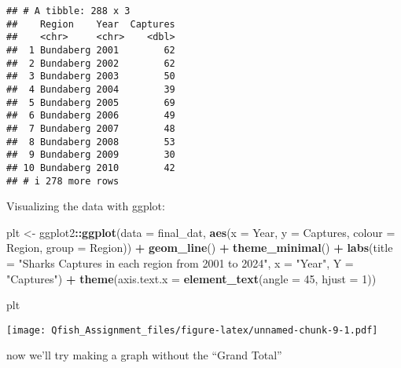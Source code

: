 \documentclass[
]{article}
\newenvironment{Shaded}{\begin{snugshade}}{\end{snugshade}}
\newcommand{\AttributeTok}[1]{\textcolor[rgb]{0.13,0.29,0.53}{#1}}
\newcommand{\DecValTok}[1]{\textcolor[rgb]{0.00,0.00,0.81}{#1}}
\newcommand{\FunctionTok}[1]{\textcolor[rgb]{0.13,0.29,0.53}{\textbf{#1}}}
\newcommand{\NormalTok}[1]{#1}
\newcommand{\OtherTok}[1]{\textcolor[rgb]{0.56,0.35,0.01}{#1}}
\newcommand{\SpecialCharTok}[1]{\textcolor[rgb]{0.81,0.36,0.00}{\textbf{#1}}}
\newcommand{\StringTok}[1]{\textcolor[rgb]{0.31,0.60,0.02}{#1}}
\begin{document}
\begin{verbatim}
## # A tibble: 288 x 3
##    Region    Year  Captures
##    <chr>     <chr>    <dbl>
##  1 Bundaberg 2001        62
##  2 Bundaberg 2002        62
##  3 Bundaberg 2003        50
##  4 Bundaberg 2004        39
##  5 Bundaberg 2005        69
##  6 Bundaberg 2006        49
##  7 Bundaberg 2007        48
##  8 Bundaberg 2008        53
##  9 Bundaberg 2009        30
## 10 Bundaberg 2010        42
## # i 278 more rows
\end{verbatim}

Visualizing the data with ggplot:

\begin{Shaded}
\begin{Highlighting}[]
\NormalTok{plt }\OtherTok{\textless{}{-}}\NormalTok{ ggplot2}\SpecialCharTok{::}\FunctionTok{ggplot}\NormalTok{(}\AttributeTok{data =}\NormalTok{ final\_dat, }\FunctionTok{aes}\NormalTok{(}\AttributeTok{x =}\NormalTok{ Year, }\AttributeTok{y =}\NormalTok{ Captures, }\AttributeTok{colour =}\NormalTok{ Region, }\AttributeTok{group =}\NormalTok{ Region)) }\SpecialCharTok{+}
  \FunctionTok{geom\_line}\NormalTok{() }\SpecialCharTok{+}
  \FunctionTok{theme\_minimal}\NormalTok{() }\SpecialCharTok{+}
  \FunctionTok{labs}\NormalTok{(}\AttributeTok{title =} \StringTok{"Sharks Captures in each region from 2001 to 2024"}\NormalTok{, }\AttributeTok{x =} \StringTok{"Year"}\NormalTok{, }\AttributeTok{Y =} \StringTok{"Captures"}\NormalTok{) }\SpecialCharTok{+}
  \FunctionTok{theme}\NormalTok{(}\AttributeTok{axis.text.x =} \FunctionTok{element\_text}\NormalTok{(}\AttributeTok{angle =} \DecValTok{45}\NormalTok{, }\AttributeTok{hjust =} \DecValTok{1}\NormalTok{))}
 
\NormalTok{plt}
\end{Highlighting}
\end{Shaded}

\texttt{[image: Qfish\_Assignment\_files/figure-latex/unnamed-chunk-9-1.pdf]}

now we'll try making a graph without the ``Grand Total''
\end{document}
